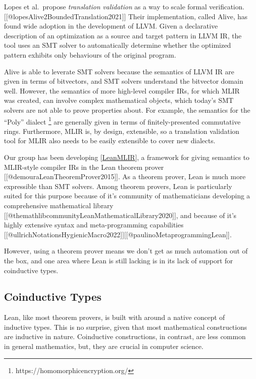 \documentclass[a4paper]{article}
\begin{document}
Lopes et al.~propose \emph{translation validation} as a way to scale
formal verification. {[}{[}@lopesAlive2BoundedTranslation2021{]}{]}
Their implementation, called Alive, has found wide adoption in the
development of LLVM. Given a declarative description of an optimization
as a source and target pattern in LLVM IR, the tool uses an SMT solver
to automatically determine whether the optimized pattern exhibits only
behaviours of the original program.

Alive is able to leverate SMT solvers because the semantics of LLVM IR
are given in terms of bitvectors, and SMT solvers understand the
bitvector domain well. However, the semantics of more high-level
compiler IRs, for which MLIR was created, can involve complex
mathematical objects, which today's SMT solvers are not able to prove
properties about. For example, the semantics for the ``Poly'' dialect
\footnote{https://homomorphicencryption.org/} are generally given in
terms of finitely-presented commutative rings. Furthermore, MLIR is, by
design, extensible, so a translation validation tool for MLIR also needs
to be easily extensible to cover new dialects.

Our group has been developing
{[}\protect\hyperlink{leanmlir}{LeanMLIR}{]}, a framework for giving
semantics to MLIR-style compiler IRs in the Lean theorem prover
{[}{[}@demouraLeanTheoremProver2015{]}{]}. As a theorem prover, Lean is
much more expressible than SMT solvers. Among theorem provers, Lean is
particularly suited for this purpose because of it's community of
mathematicians developing a comprehensive mathematical library
{[}{[}@themathlibcommunityLeanMathematicalLibrary2020{]}{]}, and because
of it's highly extensive syntax and meta-programming capabilities
{[}{[}@ullrichNotationsHygienicMacro2022{]}{]}{[}{[}@paulinoMetaprogrammingLean{]}{]}.

However, using a theorem prover means we don't get as much automation
out of the box, and one area where Lean is still lacking is in its lack
of support for coinductive types.

\hypertarget{coinductive-types}{%
\subsection{Coinductive Types}\label{coinductive-types}}

Lean, like most theorem provers, is built with around a native concept
of inductive types. This is no surprise, given that most mathematical
constructions are inductive in nature. Coinductive constructions, in
contrast, are less common in general mathematics, but, they are crucial
in computer science.
\end{document}
